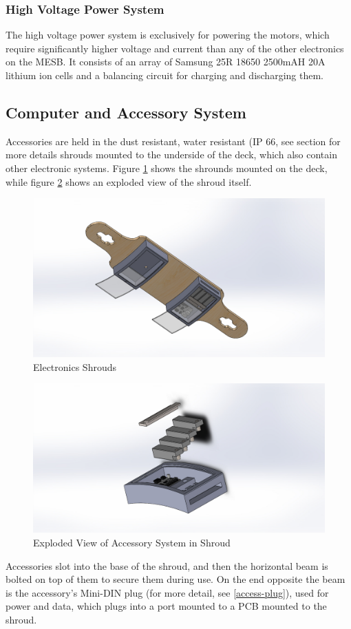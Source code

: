\documentclass[titlepage, letterpaper,12pt]{article}
\begin{document}
\subsubsection{High Voltage Power System}
The high voltage power system is exclusively for powering the motors, which require significantly higher voltage and current than any of the other electronics on the MESB. It consists of an array of Samsung 25R 18650 2500mAH 20A lithium ion cells and a balancing circuit for charging and discharging them.
\subsection{Computer and Accessory System}
Accessories are held in the dust resistant, water resistant (IP 66, see section for more details shrouds mounted to the underside of the deck, which also contain other electronic systems. Figure \ref{access-full} shows the shrounds mounted on the deck, while figure \ref{access-expl} shows an exploded view of the shroud itself.
\begin{figure}\centering
  \includegraphics[width=.7\linewidth]{ModularAssembledBottomAngle}
  \caption{Electronics Shrouds}
  \label{access-full}
\end{figure}
\begin{figure}\centering
  \includegraphics[width=.7\linewidth]{ModPieceAngleExtend}
  \caption{Exploded View of Accessory System in Shroud}
  \label{access-expl}
\end{figure}
Accessories slot into the base of the shroud, and then the horizontal beam is bolted on top of them to secure them during use. On the end opposite the beam is the accessory's Mini-DIN plug (for more detail, see \ref{access-plug}), used for power and data, which plugs into a port mounted to a PCB mounted to the shroud.
\end{document}
